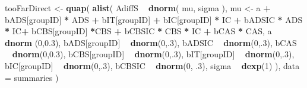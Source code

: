 \documentclass[10pt,dvipsnames,enabledeprecatedfontcommands]{scrartcl}
\newenvironment{Shaded}{\begin{snugshade}}{\end{snugshade}}
\newcommand{\KeywordTok}[1]{\textcolor[rgb]{0.13,0.29,0.53}{\textbf{#1}}}
\newcommand{\DataTypeTok}[1]{\textcolor[rgb]{0.13,0.29,0.53}{#1}}
\newcommand{\DecValTok}[1]{\textcolor[rgb]{0.00,0.00,0.81}{#1}}
\newcommand{\FloatTok}[1]{\textcolor[rgb]{0.00,0.00,0.81}{#1}}
\newcommand{\StringTok}[1]{\textcolor[rgb]{0.31,0.60,0.02}{#1}}
\newcommand{\OperatorTok}[1]{\textcolor[rgb]{0.81,0.36,0.00}{\textbf{#1}}}
\newcommand{\NormalTok}[1]{#1}
\begin{document}
\begin{Shaded}
\begin{Highlighting}[]
\NormalTok{tooFarDirect <-}\StringTok{ }\KeywordTok{quap}\NormalTok{(}
  \KeywordTok{alist}\NormalTok{(}
\NormalTok{    AdiffS }\OperatorTok{~}\StringTok{ }\KeywordTok{dnorm}\NormalTok{( mu, sigma ),}
\NormalTok{    mu <-}\StringTok{ }\NormalTok{a }\OperatorTok{+}\StringTok{ }\NormalTok{bADS[groupID] }\OperatorTok{*}\StringTok{ }\NormalTok{ADS }\OperatorTok{+}\StringTok{  }\NormalTok{bIT[groupID] }\OperatorTok{+}\StringTok{ }\NormalTok{bIC[groupID] }\OperatorTok{*}\StringTok{ }\NormalTok{IC }\OperatorTok{+}\StringTok{ }
\StringTok{      }\NormalTok{bADSIC }\OperatorTok{*}\StringTok{ }\NormalTok{ADS }\OperatorTok{*}\StringTok{ }\NormalTok{IC}\OperatorTok{+}\StringTok{ }\NormalTok{bCBS[groupID] }\OperatorTok{*}\NormalTok{CBS }\OperatorTok{+}\StringTok{ }\NormalTok{bCBSIC }\OperatorTok{*}\StringTok{ }\NormalTok{CBS }\OperatorTok{*}\StringTok{ }\NormalTok{IC }\OperatorTok{+}\StringTok{ }\NormalTok{bCAS }\OperatorTok{*}\StringTok{ }\NormalTok{CAS, }
\NormalTok{    a }\OperatorTok{~}\StringTok{ }\KeywordTok{dnorm}\NormalTok{ (}\DecValTok{0}\NormalTok{,}\FloatTok{0.3}\NormalTok{),}
\NormalTok{    bADS[groupID] }\OperatorTok{~}\StringTok{ }\KeywordTok{dnorm}\NormalTok{(}\DecValTok{0}\NormalTok{,.}\DecValTok{3}\NormalTok{),}
\NormalTok{    bADSIC }\OperatorTok{~}\StringTok{ }\KeywordTok{dnorm}\NormalTok{(}\DecValTok{0}\NormalTok{,.}\DecValTok{3}\NormalTok{),}
\NormalTok{    bCAS }\OperatorTok{~}\StringTok{ }\KeywordTok{dnorm}\NormalTok{(}\DecValTok{0}\NormalTok{,}\FloatTok{0.3}\NormalTok{),}
\NormalTok{    bCBS[groupID] }\OperatorTok{~}\StringTok{ }\KeywordTok{dnorm}\NormalTok{(}\DecValTok{0}\NormalTok{,.}\DecValTok{3}\NormalTok{),}
\NormalTok{    bIT[groupID] }\OperatorTok{~}\StringTok{ }\KeywordTok{dnorm}\NormalTok{(}\DecValTok{0}\NormalTok{,.}\DecValTok{3}\NormalTok{),}
\NormalTok{    bIC[groupID] }\OperatorTok{~}\StringTok{ }\KeywordTok{dnorm}\NormalTok{(}\DecValTok{0}\NormalTok{,.}\DecValTok{3}\NormalTok{),}
\NormalTok{    bCBSIC }\OperatorTok{~}\StringTok{ }\KeywordTok{dnorm}\NormalTok{(}\DecValTok{0}\NormalTok{, }\FloatTok{.3}\NormalTok{),}
\NormalTok{    sigma  }\OperatorTok{~}\StringTok{ }\KeywordTok{dexp}\NormalTok{(}\DecValTok{1}\NormalTok{)}
\NormalTok{  ), }
  \DataTypeTok{data =}\NormalTok{ summaries}
\NormalTok{)}





\end{Highlighting}
\end{Shaded}
\end{document}
